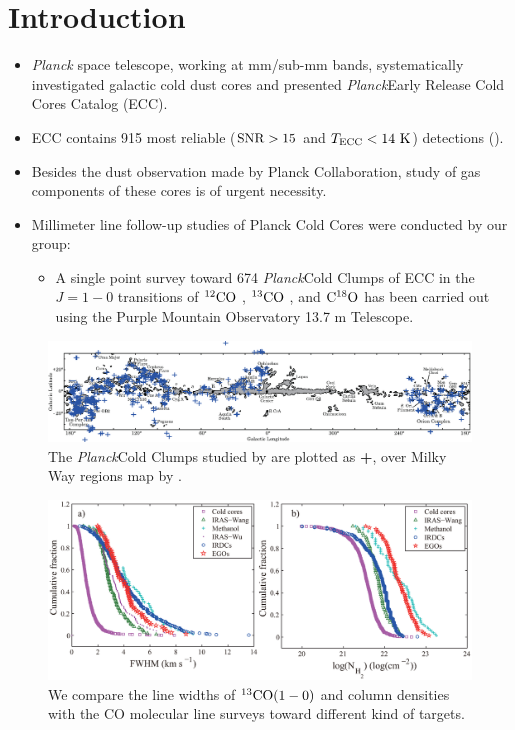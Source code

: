 \documentclass{article}
\newcommand{\coa}{$\rm ^{12}CO$ }
\newcommand{\cob}{$\rm ^{13}CO$ }
\newcommand{\coc}{$\rm C^{18}O$ }
\newcommand{\cobb}{$\rm^{13}CO(1-0)$ }
\newcommand{\Planck}{\emph{Planck}}
\begin{document}
\section{Introduction}
    \begin{itemize}
    \item \emph{Planck} space telescope, working at mm/sub-mm bands, systematically investigated galactic cold dust cores and presented  \Planck Early Release Cold Cores Catalog (ECC).

    \item ECC contains 915 most reliable ($\rm SNR>15$ and $T_{\rm ECC}<14\ \rm K$) detections (\citealt{2011A&A...536A..22P}).

    \item Besides the dust observation made by Planck Collaboration,
        study of gas components of these cores is of urgent necessity.

    \item Millimeter line follow-up studies of Planck Cold Cores were conducted by our group:
    \begin{itemize}
       \item A single point survey toward 674 \Planck Cold Clumps of ECC in the $J=1-0$ transitions of \coa, \cob, and \coc has been carried out using the Purple Mountain Observatory 13.7 m Telescope.
    \end{itemize}
\end{itemize}



\newpage

    \begin{figure}[H]
          \centering
          \includegraphics[totalheight=30 mm]{wu_distribution.eps}
          \caption{\footnotesize The \Planck Cold Clumps studied by \citet{wu2012gas} are plotted as {\color{blue}\Large{\textbf{+}}}, over Milky Way regions map by \citet{2001ApJ...547..792D}.} \label{fig:wu_distribution}
    \end{figure}
    \begin{figure}[H]\footnotesize
          \centering
          \includegraphics[totalheight=35 mm]{WML_1.eps}
          \caption{\footnotesize We compare the line widths of \cobb and column densities with the CO molecular line surveys toward different kind of targets.}
    \end{figure}
\newpage
\end{document}
